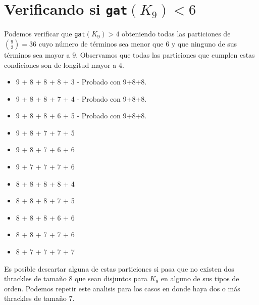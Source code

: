 \documentclass[12pt, letterpaper]{article}
\begin{document}
\section{Verificando si \texttt{gat}$(K_9) < 6$}
Podemos verificar que \texttt{gat}$(K_9) > 4$ obteniendo todas las particiones de $\binom{9}{2} = 36$ cuyo
número de términos sea menor que $6$ y que ninguno de sus términos sea mayor a $9$.
Observamos que todas las particiones que cumplen estas condiciones son de longitud mayor a $4$.
\begin{itemize}
  \item 9 + 8 + 8 + 8 + 3 - Probado con 9+8+8.
  \item 9 + 8 + 8 + 7 + 4 - Probado con 9+8+8.
  \item 9 + 8 + 8 + 6 + 5 - Probado con 9+8+8.
  \item 9 + 8 + 7 + 7 + 5 
  \item 9 + 8 + 7 + 6 + 6
  \item 9 + 7 + 7 + 7 + 6
  \item 8 + 8 + 8 + 8 + 4
  \item 8 + 8 + 8 + 7 + 5
  \item 8 + 8 + 8 + 6 + 6
  \item 8 + 8 + 7 + 7 + 6
  \item 8 + 7 + 7 + 7 + 7
\end{itemize}

Es posible descartar alguna de estas particiones si pasa que no existen dos thrackles de tamaño $8$ que sean disjuntos
para $K_9$ en alguno de sus tipos de orden. Podemos repetir este analisis para los casos en donde haya dos o más thrackles
de tamaño $7$.
\end{document}
